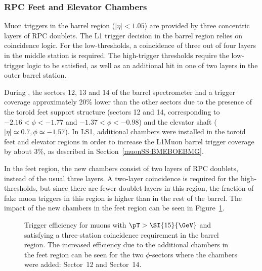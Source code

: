 \documentclass[cernpreprint, atlasdraft=false, UKenglish,british,orcidlogo, texmf, orcidlogo]{atlasdoc}
\begin{document}
\subsubsection{RPC Feet and Elevator Chambers}
Muon triggers in the barrel region ($|\eta| < 1.05$) are provided by three concentric layers of \gls{RPC} doublets.  The \gls{L1} trigger decision in the barrel region relies on coincidence logic.  For the low-\pT thresholds, a coincidence of three out of four layers in the middle station is required.  The high-\pT trigger thresholds require the low-\pT trigger logic to be satisfied, as well as an additional hit in one of two layers in the outer barrel station.
 
During \RunOne, the sectors 12, 13 and 14 of the barrel spectrometer had a trigger coverage approximately 20\% lower than the other sectors due to the presence of the toroid feet support structure (sectors 12 and 14, corresponding to $-2.16 < \phi < -1.77$ and $-1.37 < \phi < -0.98$) and the elevator shaft ($|\eta| \simeq 0.7, \phi \simeq -1.57$).  In \gls{LS1}, additional chambers were installed in the toroid feet and elevator regions in order to increase the \gls{L1Muon} barrel trigger coverage by about 3\%, as described in Section~\ref{muonSS:BMEBOEBMG}.
 
In the feet region, the new chambers consist of two layers of \gls{RPC} doublets, instead of the usual three layers.  A two-layer coincidence is required for the high-\pT thresholds, but since there are fewer doublet layers in this region, the fraction of fake muon triggers in this region is higher than in the rest of the barrel.  The impact of the new chambers in the feet region can be seen in Figure~\ref{fig:TDAQL1MuonBarrelFeetChambers}.
 
\begin{figure}[htbp!]
\centering
{}
\caption{Trigger efficiency for muons with $\pT > \SI{15}{\GeV}$ and satisfying a three-station coincidence requirement in the barrel region.  The increased efficiency due to the additional chambers in the feet region can be seen for the two $\phi$-sectors where the chambers were added: \protect{} Sector~12 and \protect{} Sector~14.
}
\label{fig:TDAQL1MuonBarrelFeetChambers}
\end{figure}
 
\end{document}
